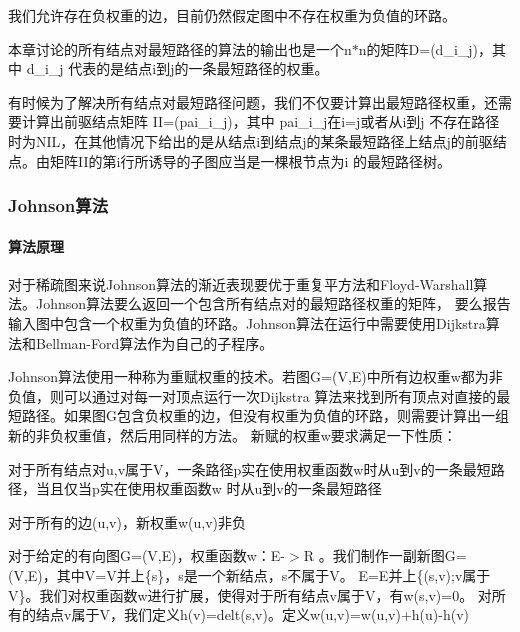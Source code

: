 我们允许存在负权重的边，目前仍然假定图中不存在权重为负值的环路。

本章讨论的所有结点对最短路径的算法的输出也是一个n$\ast$n的矩阵\+D=(d\+\_\+i\+\_\+j)，其中 d\+\_\+i\+\_\+j 代表的是结点i到j的一条最短路径的权重。

有时候为了解决所有结点对最短路径问题，我们不仅要计算出最短路径权重，还需要计算出前驱结点矩阵 I\+I=(pai\+\_\+i\+\_\+j)，其中 pai\+\_\+i\+\_\+j在i=j或者从i到j 不存在路径时为\+N\+I\+L，在其他情况下给出的是从结点i到结点j的某条最短路径上结点j的前驱结点。由矩阵\+I\+I的第i行所诱导的子图应当是一棵根节点为i 的最短路径树。

\subsubsection*{Johnson算法}

\paragraph*{算法原理}

对于稀疏图来说\+Johnson算法的渐近表现要优于重复平方法和\+Floyd-\/\+Warshall算法。\+Johnson算法要么返回一个包含所有结点对的最短路径权重的矩阵， 要么报告输入图中包含一个权重为负值的环路。\+Johnson算法在运行中需要使用\+Dijkstra算法和\+Bellman-\/\+Ford算法作为自己的子程序。

Johnson算法使用一种称为重赋权重的技术。若图\+G=(V,E)中所有边权重w都为非负值，则可以通过对每一对顶点运行一次\+Dijkstra 算法来找到所有顶点对直接的最短路径。如果图\+G包含负权重的边，但没有权重为负值的环路，则需要计算出一组新的非负权重值，然后用同样的方法。 新赋的权重w\textquotesingle{}要求满足一下性质：


\begin{DoxyItemize}
\item 对于所有结点对u,v属于\+V，一条路径p实在使用权重函数w时从u到v的一条最短路径，当且仅当p实在使用权重函数w\textquotesingle{} 时从u到v的一条最短路径
\item 对于所有的边(u,v)，新权重w\textquotesingle{}(u,v)非负
\end{DoxyItemize}

对于给定的有向图\+G=(V,E)，权重函数w：\+E-\/$>$R 。我们制作一副新图\+G\textquotesingle{}=(V\textquotesingle{},E\textquotesingle{})，其中\+V\textquotesingle{}=V并上\{s\}，s是一个新结点，s不属于\+V。 E\textquotesingle{}=E并上\{(s,v);v属于\+V\}。我们对权重函数w进行扩展，使得对于所有结点v属于\+V，有w(s,v)=0。 对所有的结点v属于\+V\textquotesingle{}，我们定义h(v)=delt(s,v)。定义w\textquotesingle{}(u,v)=w(u,v)+h(u)-\/h(v)


